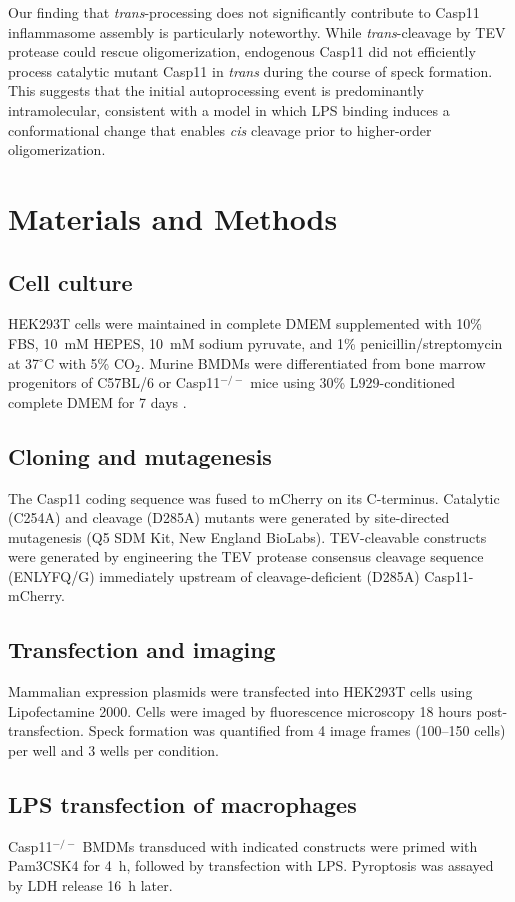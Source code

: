 \documentclass[11pt]{article}
\begin{document}
Our finding that \textit{trans}-processing does not significantly contribute to Casp11 inflammasome assembly is particularly noteworthy. While \textit{trans}-cleavage by TEV protease could rescue oligomerization, endogenous Casp11 did not efficiently process catalytic mutant Casp11 in \textit{trans} during the course of speck formation. This suggests that the initial autoprocessing event is predominantly intramolecular, consistent with a model in which LPS binding induces a conformational change that enables \textit{cis} cleavage prior to higher-order oligomerization.

\section{Materials and Methods}

\subsection{Cell culture}
HEK293T cells were maintained in complete DMEM supplemented with 10\% FBS, 10~mM HEPES, 10~mM sodium pyruvate, and 1\% penicillin/streptomycin at 37$^\circ$C with 5\% CO$_2$. Murine BMDMs were differentiated from bone marrow progenitors of C57BL/6 or Casp11$^{-/-}$ mice using 30\% L929-conditioned complete DMEM for 7 days \citep{bjanes2021genetic}.

\subsection{Cloning and mutagenesis}
The Casp11 coding sequence was fused to mCherry on its C-terminus. Catalytic (C254A) and cleavage (D285A) mutants were generated by site-directed mutagenesis (Q5 SDM Kit, New England BioLabs). TEV-cleavable constructs were generated by engineering the TEV protease consensus cleavage sequence (ENLYFQ/G) immediately upstream of cleavage-deficient (D285A) Casp11-mCherry.

\subsection{Transfection and imaging}
Mammalian expression plasmids were transfected into HEK293T cells using Lipofectamine 2000. Cells were imaged by fluorescence microscopy 18 hours post-transfection. Speck formation was quantified from 4 image frames (100--150 cells) per well and 3 wells per condition.

\subsection{LPS transfection of macrophages}
Casp11$^{-/-}$ BMDMs transduced with indicated constructs were primed with Pam3CSK4 for 4~h, followed by transfection with LPS. Pyroptosis was assayed by LDH release 16~h later.
\end{document}
